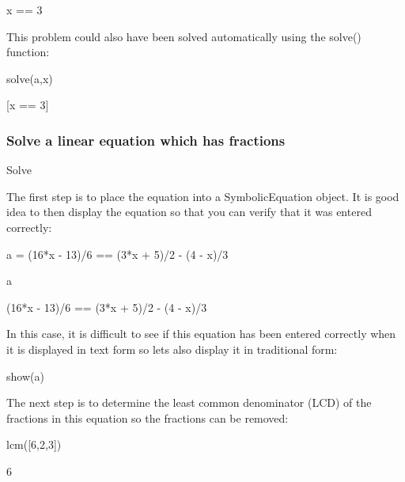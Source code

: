 \documentclass[12pt,oneside]{book}
\begin{document}
{\textbar}

x == 3

{\textquotedbl}{\textquotedbl}{\textquotedbl}

This problem could also have been solved automatically using the solve() function:

{\textquotedbl}{\textquotedbl}{\textquotedbl}

solve(a,x)

{\textbar}

[x == 3]

\subsubsection[Solve a linear equation which has fractions]{Solve a linear equation which has fractions}

Solve 


{\textquotedbl}{\textquotedbl}{\textquotedbl}

The first step is to place the equation into a SymbolicEquation object. It is good idea to then display the equation so that you can verify that it was entered correctly:

{\textquotedbl}{\textquotedbl}{\textquotedbl}

a = (16*x {}- 13)/6 == (3*x + 5)/2 {}- (4 {}- x)/3

a

{\textbar}

(16*x {}- 13)/6 == (3*x + 5)/2 {}- (4 {}- x)/3


{\textquotedbl}{\textquotedbl}{\textquotedbl}

In this case, it is difficult to see if this equation has been entered correctly when it is displayed in text form so lets also display it in traditional form:

{\textquotedbl}{\textquotedbl}{\textquotedbl}

show(a)

{\textbar}

{\textquotedbl}{\textquotedbl}{\textquotedbl}

The next step is to determine the least common denominator (LCD) of the fractions in this equation so the fractions can be removed:

{\textquotedbl}{\textquotedbl}{\textquotedbl}

lcm([6,2,3])

{\textbar}

6


{\textquotedbl}{\textquotedbl}{\textquotedbl}
\end{document}
